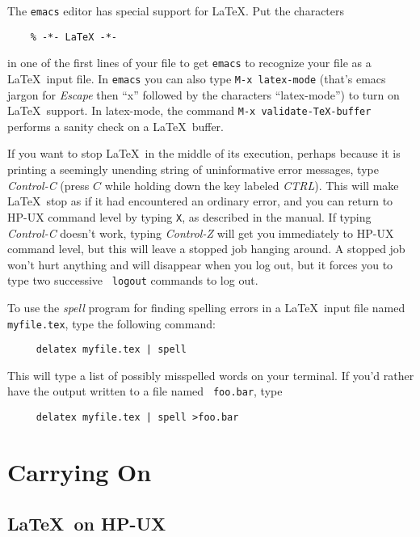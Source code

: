 \documentclass{article}
\begin{document}
The {\tt emacs} editor has special support for \LaTeX.
Put the characters
\begin{verbatim}
    % -*- LaTeX -*-
\end{verbatim}
in one of the first lines of your file to get {\tt emacs} to recognize your
file as a \LaTeX\ input file.
In {\tt emacs} you can also type {\tt M-x latex-mode}
(that's emacs jargon for {\em Escape\/} then ``x'' followed by the characters
``latex-mode'')
to turn on \LaTeX\ support.
In latex-mode,
the command {\tt M-x validate-TeX-buffer} performs a sanity check
on a \LaTeX\ buffer.

If you want to stop \LaTeX\ in the middle of its execution, perhaps
because it is printing a seemingly unending string of uninformative
error messages, type {\em Control-C\/} (press $C$ while holding down
the key labeled {\em CTRL\/}).  This will make \LaTeX\ stop as if it
had encountered an ordinary error, and you can return to HP-UX command
level by typing {\tt X}, as described in the manual.  If typing {\em
Control-C\/} doesn't work, typing {\em Control-Z\/} will get you
immediately to HP-UX command level, but this will leave a stopped job
hanging around.  A stopped job won't hurt anything and will disappear
when you log out, but it forces you to type two successive \mbox{\tt
logout} commands to log out.

To use the {\em spell\/} program for finding spelling errors in a
\LaTeX\ input file named \mbox{\tt myfile.tex}, type the following
command:
\begin{verbatim}
     delatex myfile.tex | spell
\end{verbatim}
This will type a list of possibly misspelled words on your terminal.
If you'd rather have the output written to a file named \mbox{\tt
foo.bar}, type
\begin{verbatim}
     delatex myfile.tex | spell >foo.bar
\end{verbatim}

\section{Carrying On}

\subsection{\LaTeX\ on HP-UX} \label{sec:op-system}
\end{document}
